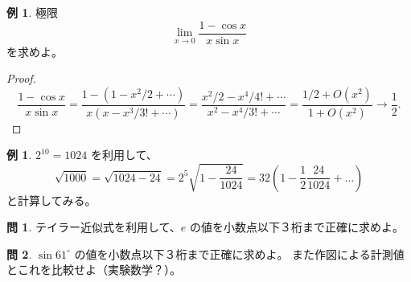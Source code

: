 \documentclass[a4paper]{jsarticle}
\theoremstyle{definition}
\newtheorem{Example}[Theorem]{例}
\newtheorem{Exercise}{問}%
\theoremstyle{remark}
\begin{document}
\begin{Example}
極限
\[
\lim_{x\to 0} \frac{1-\cos x}{x\sin x}
\]
を求めよ。
\end{Example}

\begin{proof}
\[
\frac{1-\cos x}{x\sin x} = \frac{1 - (1-x^2/2 + \cdots)}{x(x - x^3/3! +
\cdots)}
= \frac{x^2/2 - x^4/4! + \cdots}{x^2 - x^4/3! + \cdots} 
= \frac{1/2 + O(x^2)}{1 + O(x^2)} 
\to \frac{1}{2}.
\]
\end{proof}

\begin{Example}
$2^{10} = 1024$ を利用して、
\[
\sqrt{1000} = \sqrt{1024 - 24} =
2^5\sqrt{1 - \frac{24}{1024}} =
32\left(1 - \frac{1}{2} \frac{24}{1024} + \dots\right)
\]
と計算してみる。
\end{Example}

\begin{Exercise}
テイラー近似式を利用して、$e$ の値を小数点以下３桁まで正確に求めよ。
\end{Exercise}


\begin{Exercise}
$\sin 61^\circ$ の値を小数点以下３桁まで正確に求めよ。
また作図による計測値とこれを比較せよ（実験数学？）。
\end{Exercise}

\end{document}
